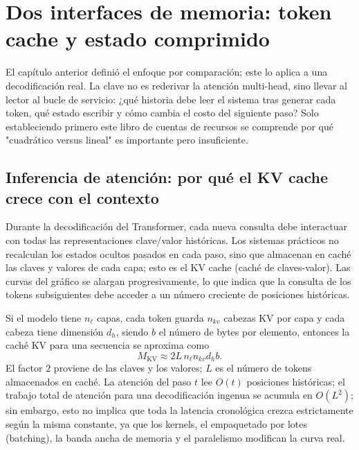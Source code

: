 \section{Dos interfaces de memoria: token cache y estado comprimido}

El capítulo anterior definió el enfoque por comparación; este lo aplica a una decodificación real. La clave no es rederivar la atención multi-head, sino llevar al lector al bucle de servicio: ¿qué historia debe leer el sistema tras generar cada token, qué estado escribir y cómo cambia el costo del siguiente paso? Solo estableciendo primero este libro de cuentas de recursos se comprende por qué "cuadrático versus lineal" es importante pero insuficiente.

\subsection{Inferencia de atención: por qué el KV cache crece con el contexto}

Durante la decodificación del Transformer, cada nueva consulta debe interactuar con todas las representaciones clave/valor históricas. Los sistemas prácticos no recalculan los estados ocultos pasados en cada paso, sino que almacenan en caché las claves y valores de cada capa; esto es el KV cache (caché de claves-valor). Las curvas del gráfico se alargan progresivamente, lo que indica que la consulta de los tokens subsiguientes debe acceder a un número creciente de posiciones históricas.


Si el modelo tiene $n_\ell$ capas, cada token guarda $n_{kv}$ cabezas KV por capa y cada cabeza tiene dimensión $d_h$, siendo $b$ el número de bytes por elemento, entonces la caché KV para una secuencia se aproxima como
\[
M_{\mathrm{KV}}\approx 2L\,n_\ell n_{kv}d_h b.
\]
El factor $2$ proviene de las claves y los valores; $L$ es el número de tokens almacenados en caché. La atención del paso $t$ lee $O(t)$ posiciones históricas; el trabajo total de atención para una decodificación ingenua se acumula en $O(L^2)$; sin embargo, esto no implica que toda la latencia cronológica crezca estrictamente según la misma constante, ya que los kernels, el empaquetado por lotes (batching), la banda ancha de memoria y el paralelismo modifican la curva real.

